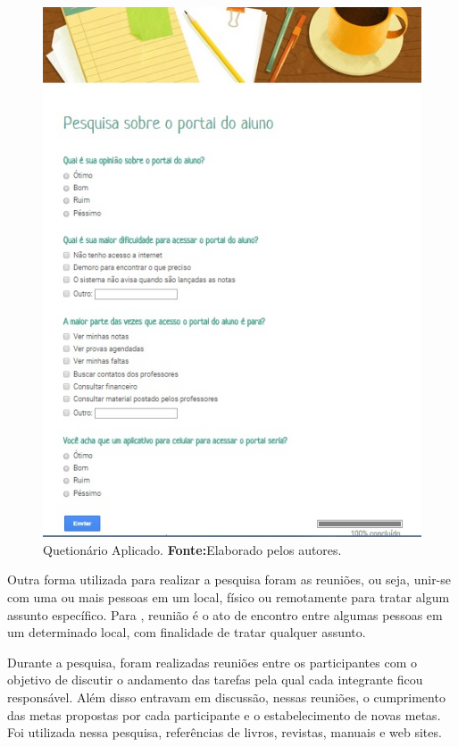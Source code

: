\begin{figure}[h!]
	\centerline{\includegraphics[scale=0.5]{./imagens/imagem4.png}}
	\caption[Quetionário Aplicado]{Quetionário Aplicado.
	 \textbf{Fonte:}Elaborado pelos autores.}
	\label{fig:exemplo4}
\end{figure}

\pagebreak

	\par Outra forma utilizada para realizar a pesquisa foram as reuniões, ou seja,
unir-se com uma ou mais pessoas em um local, físico ou remotamente para tratar
algum assunto específico. Para , reunião é o ato
de encontro entre algumas pessoas em um determinado local, com finalidade de tratar
qualquer assunto.

	\par Durante a pesquisa, foram realizadas reuniões entre os participantes com o
objetivo de discutir o andamento das tarefas pela qual cada integrante ficou
responsável. Além disso entravam em discussão, nessas reuniões, o cumprimento
das metas propostas por cada participante e o estabelecimento de novas metas.
Foi utilizada nessa pesquisa, referências de livros, revistas, manuais e web
sites.


